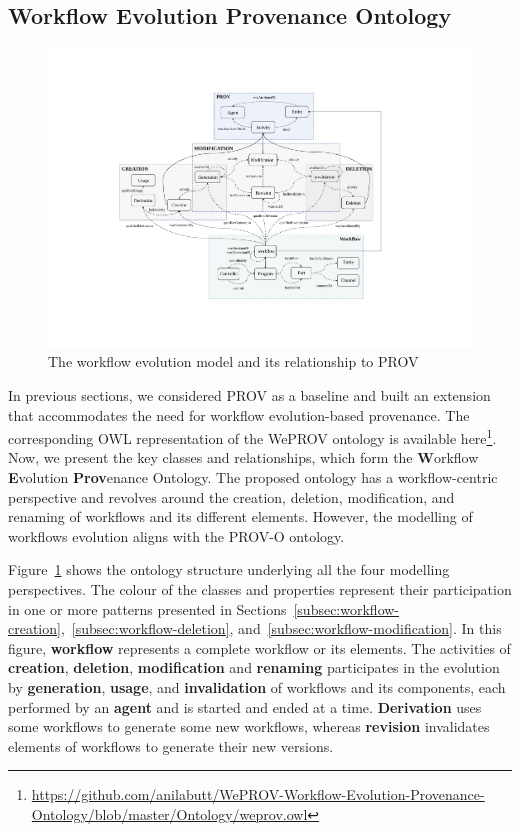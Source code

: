 \documentclass[ao]{iosart2x}
\begin{document}
\subsection{Workflow Evolution Provenance Ontology}
\label{subsec:evolution}

\begin{figure}[htpb]
\centering
    \includegraphics[width=1.0\linewidth]{figures/workflow-evolution-model.pdf}
    \caption{The workflow evolution model and its relationship to PROV}
    \label{fig:worklfow-evolution-model}
\end{figure}

In previous sections, we considered PROV as a baseline and built an extension that accommodates the need for workflow evolution-based provenance. The corresponding OWL representation of the WePROV ontology is available here\footnote{\url{https://github.com/anilabutt/WePROV-Workflow-Evolution-Provenance-Ontology/blob/master/Ontology/weprov.owl}}. Now, we present the key classes and relationships, which form the \textbf{W}orkflow \textbf{E}volution \textbf{Prov}enance Ontology. 
The proposed ontology has a workflow-centric perspective and revolves around the creation, deletion, modification, and renaming of workflows and its different elements. However, the modelling of workflows evolution aligns with the PROV-O ontology.

Figure~\ref{fig:worklfow-evolution-model} shows the ontology structure underlying all the four modelling perspectives. The colour of the classes and properties represent their participation in one or more patterns presented in Sections~\ref{subsec:workflow-creation},~\ref{subsec:workflow-deletion}, and~\ref{subsec:workflow-modification}. In this figure, \textbf{workflow} represents a complete workflow or its elements. %
The activities of \textbf{creation}, \textbf{deletion}, \textbf{modification} and \textbf{renaming} participates in the evolution by \textbf{generation}, \textbf{usage}, and \textbf{invalidation} of workflows and its components, each performed by an \textbf{agent} and is started and ended at a time. \textbf{Derivation} uses some workflows to generate some new workflows, whereas \textbf{revision} invalidates elements of workflows to generate their new versions. 
\end{document}
